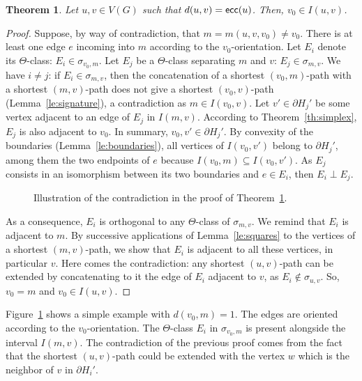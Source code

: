 \documentclass{article}
\newtheorem{theorem}{Theorem}
\newcommand{\ecc}{\mbox{\textsf{ecc}}}
\begin{document}
\begin{theorem}
Let $u,v \in V(G)$ such that $d(u,v) = \ecc(u)$. Then, $v_0 \in I(u,v)$.
\label{th:center_simplex}
\end{theorem}
\begin{proof}
Suppose, by way of contradiction, that $m = m(u,v,v_0) \neq v_0$. There is at least one edge $e$ incoming into $m$ according to the $v_0$-orientation. Let $E_i$ denote its $\Theta$-class: $E_i \in \sigma_{v_0,m}$. Let $E_j$ be a $\Theta$-class separating $m$ and $v$: $E_j \in \sigma_{m,v}$. We have $i \neq j$: if $E_i \in \sigma_{m,v}$, then the concatenation of a shortest $(v_0,m)$-path with a shortest $(m,v)$-path does not give a shortest $(v_0,v)$-path (Lemma~\ref{le:signature}), a contradiction as $m \in I(v_0,v)$. Let $v' \in \partial H_j'$ be some vertex adjacent to an edge of $E_j$ in $I(m,v)$. According to Theorem~\ref{th:simplex}, $E_j$ is also adjacent to $v_0$. In summary, $v_0,v' \in \partial H_j'$. By convexity of the boundaries (Lemma~\ref{le:boundaries}), all vertices of $I(v_0,v')$ belong to $\partial H_j'$, among them the two endpoints of $e$ because $I(v_0,m) \subseteq I(v_0,v')$. As $E_j$ consists in an isomorphism between its two boundaries and $e \in E_i$, then $E_i \perp E_j$.

\begin{figure}[h]
\centering
\scalebox{0.8}{}
\caption{Illustration of the contradiction in the proof of Theorem~\ref{th:center_simplex}.}
\label{fig:center_simplex}
\end{figure}

As a consequence, $E_i$ is orthogonal to any $\Theta$-class of $\sigma_{m,v}$. We remind that $E_i$ is adjacent to $m$. By successive applications of Lemma~\ref{le:squares} to the vertices of a shortest $(m,v)$-path, we show that $E_i$ is adjacent to all these vertices, in particular $v$. 
Here comes the contradiction: any shortest $(u,v)$-path can be extended by concatenating to it the edge of $E_i$ adjacent to $v$, as $E_i \notin \sigma_{u,v}$. So, $v_0 = m$ and $v_0 \in I(u,v)$. 
\end{proof}

Figure~\ref{fig:center_simplex} shows a simple example with $d(v_0,m) = 1$. The edges are oriented according to the $v_0$-orientation. The $\Theta$-class $E_i$ in $\sigma_{v_0,m}$ is present alongside the interval $I(m,v)$. The contradiction of the previous proof comes from the fact that the shortest $(u,v)$-path could be extended with the vertex $w$ which is the neighbor of $v$ in $\partial H_i'$.
\end{document}
